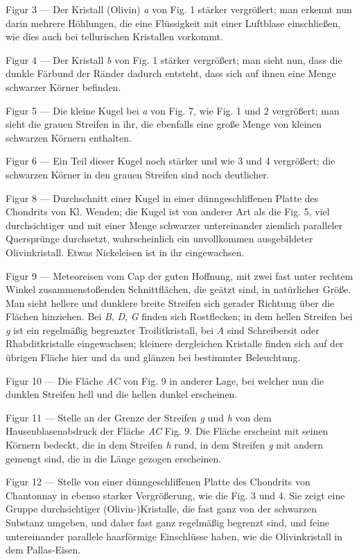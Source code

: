\documentclass[a4paper, 11pt, oneside]{article}
\begin{document}
Figur 3 --- Der Kristall (Olivin) \emph{a} von Fig. 1 stärker vergrößert; man erkennt nun darin mehrere Höhlungen, die eine Flüssigkeit mit einer Luftblase einschließen, wie dies auch bei tellurischen Kristallen vorkommt.

Figur 4 --- Der Kristall \emph{b} von Fig. 1 stärker vergrößert; man sieht nun, dass die dunkle Färbund der Ränder dadurch entsteht, dass sich auf ihnen eine Menge schwarzer Körner befinden.

Figur 5 --- Die kleine Kugel bei \emph{a} von Fig. 7, wie Fig. 1 und 2 vergrößert; man sieht die grauen Streifen in ihr, die ebenfalls eine große Menge von kleinen schwarzen Körnern enthalten.

Figur 6 --- Ein Teil dieser Kugel noch stärker und wie 3 und 4 vergrößert; die schwarzen Körner in den grauen Streifen sind noch deutlicher.

Figur 8 --- Durchschnitt einer Kugel in einer dünngeschliffenen Platte des Chondrits von Kl. Wenden; die Kugel ist von anderer Art als die Fig. 5, viel durchsichtiger und mit einer Menge schwarzer untereinander ziemlich paralleler Quersprünge durchsetzt, wahrscheinlich ein unvollkommen ausgebildeter Olivinkristall. Etwas Nickeleisen ist in ihr eingewachsen.

Figur 9 --- Meteoreisen vom Cap der guten Hoffnung, mit zwei fast unter rechtem Winkel zusammenstoßenden Schnittflächen, die geätzt sind, in natürlicher Größe. Man sieht hellere und dunklere breite Streifen sich gerader Richtung über die Flächen hinziehen. Bei \emph{B}, \emph{D}, \emph{G} finden sich Rostflecken; in dem hellen Streifen bei \emph{g} ist ein regelmäßig begrenzter Troilitkristall, bei \emph{A} sind Schreibersit oder Rhabditkristalle eingewachsen; kleinere dergleichen Kristalle finden sich auf der übrigen Fläche hier und da und glänzen bei bestimmter Beleuchtung.

Figur 10 --- Die Fläche \emph{AC} von Fig. 9 in anderer Lage, bei welcher nun die dunklen Streifen hell und die hellen dunkel erscheinen.

Figur 11 --- Stelle an der Grenze der Streifen \emph{g} und \emph{h} von dem Hausenblasenabdruck der Fläche \emph{AC} Fig. 9. Die Fläche erscheint mit seinen Körnern bedeckt, die in dem Streifen \emph{h} rund, in dem Streifen \emph{g} mit andern gemengt sind, die in die Länge gezogen erscheinen.

Figur 12 --- Stelle von einer dünngeschliffenen Platte des Chondrits von Chantonnay in ebenso starker Vergrößerung, wie die Fig. 3 und 4. Sie zeigt eine Gruppe durchsichtiger (Olivin-)Kristalle, die fast ganz von der schwarzen Substanz umgeben, und daher fast ganz regelmäßig begrenzt sind, und feine untereinander parallele haarförmige Einschlüsse haben, wie die Olivinkristall in dem Pallas-Eisen.
\end{document}
